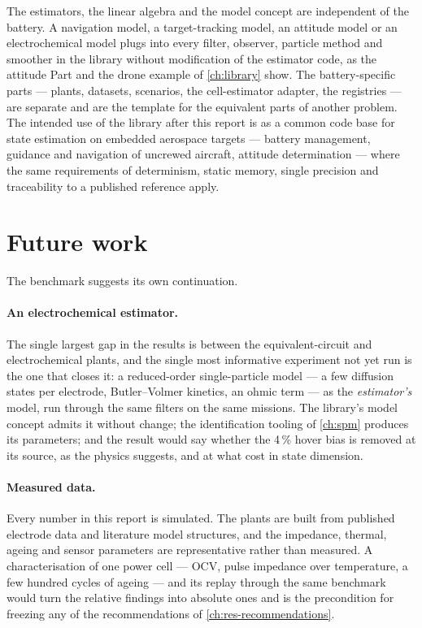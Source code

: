 The estimators, the linear algebra and the model concept are independent of the battery. A
navigation model, a target-tracking model, an attitude model or an electrochemical model plugs
into every filter, observer, particle method and smoother in the library without modification
of the estimator code, as the attitude Part and the drone example of \cref{ch:library} show.
The battery-specific parts --- plants, datasets, scenarios, the cell-estimator adapter, the
registries --- are separate and are the template for the equivalent parts of another problem.
The intended use of the library after this report is as a common code base for state
estimation on embedded aerospace targets --- battery management, guidance and navigation of
uncrewed aircraft, attitude determination --- where the same requirements of determinism,
static memory, single precision and traceability to a published reference apply.

\section{Future work}

The benchmark suggests its own continuation.

\paragraph{An electrochemical estimator.} The single largest gap in the results is between the
equivalent-circuit and electrochemical plants, and the single most informative experiment not
yet run is the one that closes it: a reduced-order single-particle model --- a few diffusion
states per electrode, Butler--Volmer kinetics, an ohmic term --- as the \emph{estimator's}
model, run through the same filters on the same missions. The library's model concept admits it
without change; the identification tooling of \cref{ch:spm} produces its parameters; and the
result would say whether the \num{4}\,\% hover bias is removed at its source, as the physics
suggests, and at what cost in state dimension.

\paragraph{Measured data.} Every number in this report is simulated. The plants are built from
published electrode data and literature model structures, and the impedance, thermal, ageing
and sensor parameters are representative rather than measured. A characterisation of one
power cell --- OCV, pulse impedance over temperature, a few hundred cycles of ageing --- and
its replay through the same benchmark would turn the relative findings into absolute ones and
is the precondition for freezing any of the recommendations of \cref{ch:res-recommendations}.

